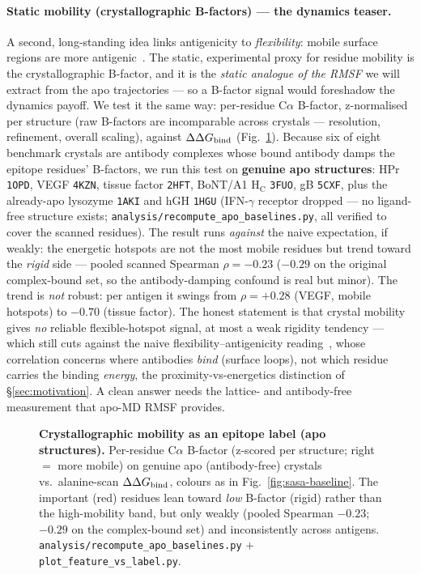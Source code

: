 \paragraph{Static mobility (crystallographic B-factors) --- the dynamics teaser.} A second,
long-standing idea links antigenicity to \emph{flexibility}: mobile surface regions are more
antigenic~\cite{westhof1984}. The static, experimental proxy for residue mobility is the
crystallographic B-factor, and it is the \emph{static analogue of the RMSF} we will extract from the
apo trajectories --- so a B-factor signal would foreshadow the dynamics payoff. We test it the same
way: per-residue C$\alpha$ B-factor, z-normalised per structure (raw B-factors are incomparable
across crystals --- resolution, refinement, overall scaling), against $\Delta\Delta G_{\mathrm{bind}}$
(Fig.~\ref{fig:bfactor-baseline}). Because six of eight benchmark crystals are antibody complexes
whose bound antibody damps the epitope residues' B-factors, we run this test on \textbf{genuine apo
structures}: HPr \texttt{1OPD}, VEGF \texttt{4KZN}, tissue factor \texttt{2HFT}, BoNT/A1
H$_\mathrm{C}$ \texttt{3FUO}, gB \texttt{5CXF}, plus the already-apo lysozyme \texttt{1AKI} and hGH
\texttt{1HGU} (IFN-$\gamma$ receptor dropped --- no ligand-free structure exists;
\texttt{analysis/recompute\_apo\_baselines.py}, all verified to cover the scanned residues). The
result runs \emph{against} the naive expectation, if weakly: the energetic hotspots are not the most
mobile residues but trend toward the \emph{rigid} side --- pooled scanned Spearman $\rho = -0.23$
($-0.29$ on the original complex-bound set, so the antibody-damping confound is real but minor). The
trend is \emph{not} robust: per antigen it swings from $\rho=+0.28$ (VEGF, mobile hotspots) to $-0.70$
(tissue factor). The honest statement is that crystal mobility gives \emph{no} reliable
flexible-hotspot signal, at most a weak rigidity tendency --- which still cuts against the naive
flexibility--antigenicity reading~\cite{westhof1984}, whose correlation concerns where antibodies
\emph{bind} (surface loops), not which residue carries the binding \emph{energy}, the
proximity-vs-energetics distinction of \S\ref{sec:motivation}. A clean answer needs the lattice- and
antibody-free measurement that apo-MD RMSF provides.

\begin{figure}[H]\centering
{}
\caption{\textbf{Crystallographic mobility as an epitope label (apo structures).} Per-residue
C$\alpha$ B-factor (z-scored per structure; right $=$ more mobile) on genuine apo (antibody-free)
crystals vs.\ alanine-scan $\Delta\Delta G_{\mathrm{bind}}$, colours as in Fig.~\ref{fig:sasa-baseline}. The important (red)
residues lean toward \emph{low} B-factor (rigid) rather than the high-mobility band, but only weakly
(pooled Spearman $-0.23$; $-0.29$ on the complex-bound set) and inconsistently across antigens.
\texttt{analysis/recompute\_apo\_baselines.py} $+$ \texttt{plot\_feature\_vs\_label.py}.}\label{fig:bfactor-baseline}
\end{figure}

